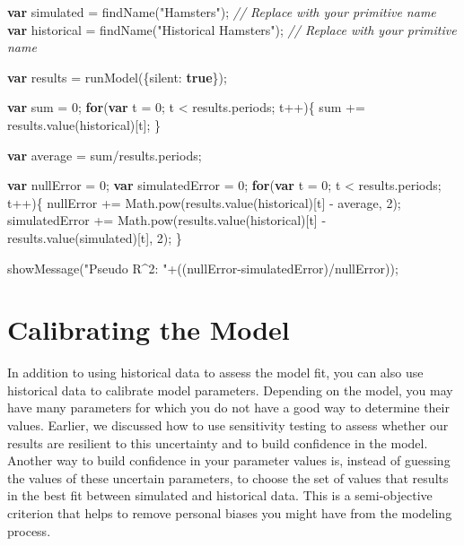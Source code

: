 \documentclass[]{memoir}
\newenvironment{Shaded}{}{}
\newcommand{\KeywordTok}[1]{\textcolor[rgb]{0.00,0.44,0.13}{\textbf{{#1}}}}
\newcommand{\DataTypeTok}[1]{\textcolor[rgb]{0.56,0.13,0.00}{{#1}}}
\newcommand{\DecValTok}[1]{\textcolor[rgb]{0.25,0.63,0.44}{{#1}}}
\newcommand{\StringTok}[1]{\textcolor[rgb]{0.25,0.44,0.63}{{#1}}}
\newcommand{\CommentTok}[1]{\textcolor[rgb]{0.38,0.63,0.69}{\textit{{#1}}}}
\newcommand{\OtherTok}[1]{\textcolor[rgb]{0.00,0.44,0.13}{{#1}}}
\newcommand{\FunctionTok}[1]{\textcolor[rgb]{0.02,0.16,0.49}{{#1}}}
\newcommand{\NormalTok}[1]{{#1}}
\begin{document}
\begin{Shaded}
\begin{Highlighting}[]
\KeywordTok{var} \NormalTok{simulated = }\FunctionTok{findName}\NormalTok{(}\StringTok{"Hamsters"}\NormalTok{); }\CommentTok{// Replace with your primitive name}
\KeywordTok{var} \NormalTok{historical = }\FunctionTok{findName}\NormalTok{(}\StringTok{"Historical Hamsters"}\NormalTok{); }\CommentTok{// Replace with your primitive name}

\KeywordTok{var} \NormalTok{results = }\FunctionTok{runModel}\NormalTok{(\{}\DataTypeTok{silent}\NormalTok{: }\KeywordTok{true}\NormalTok{\});}

\KeywordTok{var} \NormalTok{sum = }\DecValTok{0}\NormalTok{;}
\KeywordTok{for}\NormalTok{(}\KeywordTok{var} \NormalTok{t = }\DecValTok{0}\NormalTok{; t < }\OtherTok{results}\NormalTok{.}\FunctionTok{periods}\NormalTok{; t++)\{}
    \NormalTok{sum += }\OtherTok{results}\NormalTok{.}\FunctionTok{value}\NormalTok{(historical)[t];}
\NormalTok{\}}

\KeywordTok{var} \NormalTok{average = sum/}\OtherTok{results}\NormalTok{.}\FunctionTok{periods}\NormalTok{;}

\KeywordTok{var} \NormalTok{nullError = }\DecValTok{0}\NormalTok{;}
\KeywordTok{var} \NormalTok{simulatedError = }\DecValTok{0}\NormalTok{;}
\KeywordTok{for}\NormalTok{(}\KeywordTok{var} \NormalTok{t = }\DecValTok{0}\NormalTok{; t < }\OtherTok{results}\NormalTok{.}\FunctionTok{periods}\NormalTok{; t++)\{}
    \NormalTok{nullError += }\OtherTok{Math}\NormalTok{.}\FunctionTok{pow}\NormalTok{(}\OtherTok{results}\NormalTok{.}\FunctionTok{value}\NormalTok{(historical)[t] - average, }\DecValTok{2}\NormalTok{);}
    \NormalTok{simulatedError += }\OtherTok{Math}\NormalTok{.}\FunctionTok{pow}\NormalTok{(}\OtherTok{results}\NormalTok{.}\FunctionTok{value}\NormalTok{(historical)[t] - }\OtherTok{results}\NormalTok{.}\FunctionTok{value}\NormalTok{(simulated)[t], }\DecValTok{2}\NormalTok{);}
\NormalTok{\}}

\FunctionTok{showMessage}\NormalTok{(}\StringTok{"Pseudo R^2: "}\NormalTok{+((nullError-simulatedError)/nullError));}
\end{Highlighting}
\end{Shaded}

\section{Calibrating the Model}

In addition to using historical data to assess the model fit, you can
also use historical data to calibrate model parameters. Depending on the
model, you may have many parameters for which you do not have a good way
to determine their values. Earlier, we discussed how to use sensitivity
testing to assess whether our results are resilient to this uncertainty
and to build confidence in the model. Another way to build confidence in
your parameter values is, instead of guessing the values of these
uncertain parameters, to choose the set of values that results in the
best fit between simulated and historical data. This is a semi-objective
criterion that helps to remove personal biases you might have from the
modeling process.
\end{document}
